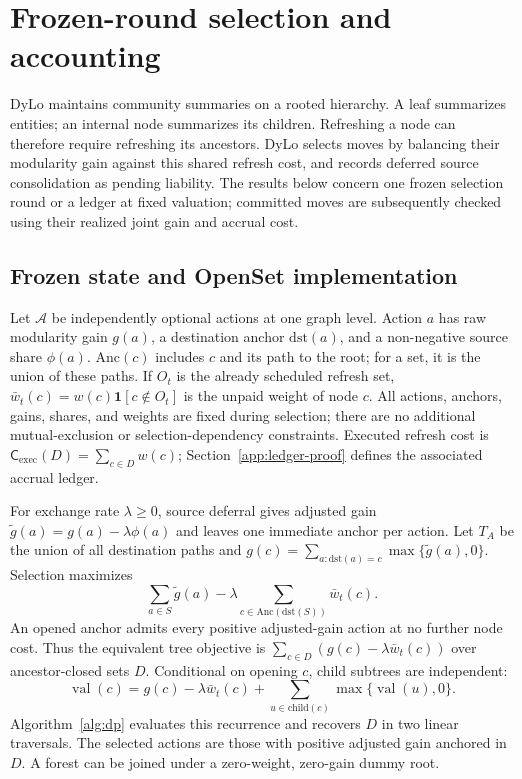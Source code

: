 \section{Frozen-round selection and accounting}\label{app:selection}

DyLo maintains community summaries on a rooted hierarchy. A leaf summarizes
entities; an internal node summarizes its children. Refreshing a node can
therefore require refreshing its ancestors. DyLo selects moves by balancing
their modularity gain against this shared refresh cost, and records deferred
source consolidation as pending liability. The results below concern one
frozen selection round or a ledger at fixed valuation; committed moves are
subsequently checked using their realized joint gain and accrual cost.

\subsection{Frozen state and OpenSet implementation}\label{app:selection-dp}

Let $\mathcal A$ be independently optional actions at one graph level.
Action $a$ has raw modularity gain $g(a)$, a destination anchor
$\mathrm{dst}(a)$, and a non-negative source share $\phi(a)$.
$\mathrm{Anc}(c)$ includes $c$ and its path to the root; for a set, it is
the union of these paths. If $O_t$ is the already scheduled refresh set,
$\bar w_t(c)=w(c)\mathbf1[c\notin O_t]$ is the unpaid weight of node $c$.
All actions, anchors, gains, shares, and weights are fixed during selection;
there are no additional mutual-exclusion or selection-dependency constraints.
Executed refresh cost is $\mathsf C_{\mathrm{exec}}(D)=\sum_{c\in D}w(c)$;
Section~\ref{app:ledger-proof} defines the associated accrual ledger.

For exchange rate $\lambda\ge0$, source deferral gives adjusted gain
$\tilde g(a)=g(a)-\lambda\phi(a)$ and leaves one immediate anchor per action.
Let $T_A$ be the union of all destination paths and
$g(c)=\sum_{a:\mathrm{dst}(a)=c}\max\{\tilde g(a),0\}$.
Selection maximizes
\[
\sum_{a\in S}\tilde g(a)
-\lambda\sum_{c\in\mathrm{Anc}(\mathrm{dst}(S))}\bar w_t(c).
\]
An opened anchor admits every positive adjusted-gain action at no further
node cost. Thus the equivalent tree objective is
$\sum_{c\in D}(g(c)-\lambda\bar w_t(c))$ over ancestor-closed sets $D$.
Conditional on opening $c$, child subtrees are independent:
\begin{equation}\label{eq:supp-openset}
\operatorname{val}(c)=g(c)-\lambda\bar w_t(c)
 +\sum_{u\in\mathrm{child}(c)}\max\{\operatorname{val}(u),0\}.
\end{equation}
Algorithm~\ref{alg:dp} evaluates this recurrence and recovers $D$ in two
linear traversals. The selected actions are those with positive adjusted
gain anchored in $D$. A forest can be joined under a zero-weight,
zero-gain dummy root.

